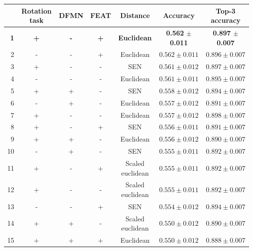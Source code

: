 \documentclass[a4paper, 12pt]{report}
\begin{document}
\begin{table}[h!]
\begin{adjustbox}{center}
\begin{tabular}{| r | c c c c | c |  c | }
\hline
    & Rotation task   & DFMN   & FEAT   & Distance         & Accuracy         & Top-3 accuracy   \\
    \hline
 \textbf{1} & \textbf{+} & \textbf{-} & \textbf{+} & \textbf{Euclidean} & \textbf{0.562} $\pm$ \textbf{0.011} & \textbf{0.897} $\pm$ \textbf{0.007} \\
    \hline
  2 & -               & -      & +      & Euclidean        & $0.562 \pm 0.011$ & $0.896 \pm 0.007$ \\
    \hline
  3 & +               & -      & -      & SEN              & $0.561 \pm 0.012$ & $0.897 \pm 0.007$ \\
    \hline
  4 & -               & -      & -      & Euclidean        & $0.561 \pm 0.011$ & $0.895 \pm 0.007$ \\
    \hline
  5 & +               & +      & -      & SEN              & $0.558 \pm 0.012$ & $0.894 \pm 0.007$ \\
    \hline
  6 & -               & +      & -      & Euclidean        & $0.557 \pm 0.012$ & $0.891 \pm 0.007$ \\
    \hline
  7 & +               & -      & -      & Euclidean        & $0.557 \pm 0.012$ & $0.898 \pm 0.007$ \\
    \hline
  8 & +               & -      & +      & SEN              & $0.556 \pm 0.011$ & $0.891 \pm 0.007$ \\
    \hline
  9 & +               & +      & -      & Euclidean        & $0.556 \pm 0.012$ & $0.890 \pm 0.007$ \\
    \hline
 10 & -               & +      & -      & SEN              & $0.555 \pm 0.011$ & $0.892 \pm 0.007$ \\
    \hline
 11 & +               & -      & +      & Scaled euclidean & $0.555 \pm 0.011$ & $0.892 \pm 0.007$ \\
    \hline
 12 & +               & -      & -      & Scaled euclidean & $0.555 \pm 0.011$ & $0.892 \pm 0.007$ \\
    \hline
 13 & -               & -      & +      & SEN              & $0.554 \pm 0.012$ & $0.894 \pm 0.007$ \\
    \hline
 14 & +               & +      & -      & Scaled euclidean & $0.550 \pm 0.012$ & $0.890 \pm 0.007$ \\
    \hline
 15 & +               & +      & +      & Euclidean        & $0.550 \pm 0.012$ & $0.888 \pm 0.007$ \\

\end{tabular}
\end{adjustbox}
\end{table}
\end{document}
